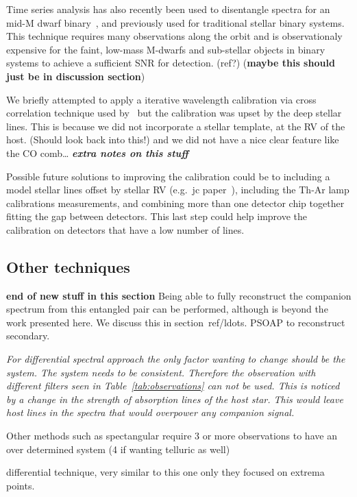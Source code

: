 Time series analysis has also recently been used to disentangle spectra for an mid-M dwarf binary~\citep{czekala_disentangling_2017}, and previously used for traditional stellar binary systems. This technique requires many observations along the orbit and is observationaly expensive for the faint, low-mass M-dwarfs and sub-stellar objects in binary systems to achieve a sufficient {SNR} for detection. (ref?) (\textbf{maybe this should just be in discussion section})



We briefly attempted to apply a iterative wavelength calibration via cross correlation technique used by~\citet{brogi_rotation_2016} but the calibration was upset by the deep stellar lines. This is because we did not incorporate a stellar template, at the {RV} of the host. (Should look back into this!) and we did not have a nice clear feature like the CO comb\ldots
\textbf{\emph{extra notes on this stuff}}

Possible future solutions to improving the calibration could be to including a model stellar lines offset by stellar {RV} (e.g.\ jc paper~\citep{piskorz_evidence_2016}), including the Th-Ar lamp calibrations measurements, and combining more than one detector chip together fitting the gap between detectors. This last step could help improve the calibration on detectors that have a low number of lines.




\subsection{Other techniques}

\textbf{end of new stuff in this section}
Being able to fully reconstruct the companion spectrum from this entangled pair can be performed, although is beyond the work presented here. We discuss this in section~ref{}/ldots. PSOAP to reconstruct secondary.

\emph{
For differential spectral approach the only factor wanting to change should be the system. The system needs to be consistent. Therefore the observation with different filters seen in Table~\ref{tab:observations} can not be used. This is noticed by a change in the strength of absorption lines of the host star. This would leave host lines in the spectra that would overpower any companion signal.}

Other methods such as spectangular require 3 or more observations to have an over determined system (4 if wanting telluric as well)


\citep{kostogryz_spectral_2013} differential technique, very similar to this one only they focused on extrema points.
